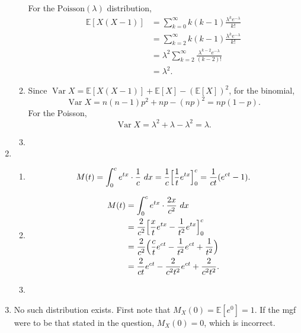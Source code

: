 \documentclass{article}
\DeclareMathOperator{\var}{Var}
\begin{document}
\begin{enumerate}
\begin{enumerate}
        For the $\text{Poisson}(\lambda)$ distribution, 
        \begin{align*}
            \mathbb{E}[X(X - 1)]
            &= \sum_{k = 0}^{\infty} k(k - 1) \frac{\lambda^k e^{-\lambda}}{k!} \\
            &= \sum_{k = 2}^{\infty} k(k - 1) \frac{\lambda^k e^{-\lambda}}{k!} \\
            &= \lambda^2 \sum_{k = 2}^{\infty} \frac{\lambda^{k - 2} e^{-\lambda}}{(k - 2)!} \\
            &= \lambda^2.
        \end{align*}

        \item Since $\var{X} = \mathbb{E}[X(X - 1)] + \mathbb{E}[X] - (\mathbb{E}[X])^2$, for the binomial, 
        \[ \var{X} = n(n - 1)p^2 + np - (np)^2 = np(1 - p). \]
        For the Poisson, 
        \[ \var{X} = \lambda^2 + \lambda - \lambda^2 = \lambda. \]

        \item 
    \end{enumerate}

    \item \begin{enumerate}
        \item \[
        M(t) = \int_{0}^{c} e^{tx} \cdot \frac{1}{c} \ dx 
        = \frac{1}{c} \Bigl[ \frac{1}{t}e^{tx} \Bigr]_{0}^{c} 
        = \frac{1}{ct} (e^{ct} - 1). \]

        \item \begin{align*}
            M(t)
            &= \int_{0}^{c} e^{tx} \cdot \frac{2x}{c^2} \ dx \\
            &= \frac{2}{c^2} \Bigl[ \frac{x}{t}e^{tx} - \frac{1}{t^2}e^{tx} \Bigr]_0^c \\
            &= \frac{2}{c^2} \Bigl( \frac{c}{t}e^{ct} - \frac{1}{t^2}e^{ct} + \frac{1}{t^2} \Bigr) \\
            &= \frac{2}{ct}e^{ct} - \frac{2}{c^2 t^2}e^{ct} + \frac{2}{c^2 t^2}.
        \end{align*}

        \item 
    \end{enumerate}

    \item No such distribution exists. First note that $M_{X}(0) = \mathbb{E}[e^0] = 1$. If the mgf were 
    to be that stated in the question, $M_X(0) = 0$, which is incorrect.


\end{enumerate}
\end{document}
